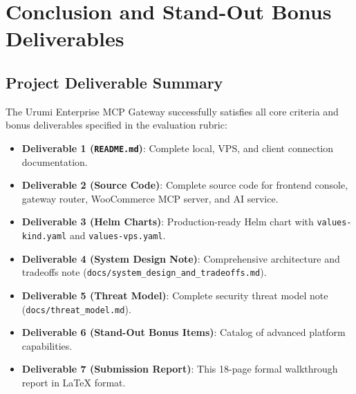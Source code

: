 \documentclass[11pt,a4paper]{article}
\begin{document}
\section{Conclusion and Stand-Out Bonus Deliverables}

\subsection{Project Deliverable Summary}
The Urumi Enterprise MCP Gateway successfully satisfies all core criteria and bonus deliverables specified in the evaluation rubric:
\begin{itemize}[leftmargin=*]
    \item \textbf{Deliverable 1 (\texttt{README.md})}: Complete local, VPS, and client connection documentation.
    \item \textbf{Deliverable 2 (Source Code)}: Complete source code for frontend console, gateway router, WooCommerce MCP server, and AI service.
    \item \textbf{Deliverable 3 (Helm Charts)}: Production-ready Helm chart with \texttt{values-kind.yaml} and \texttt{values-vps.yaml}.
    \item \textbf{Deliverable 4 (System Design Note)}: Comprehensive architecture and tradeoffs note (\texttt{docs/system\_design\_and\_tradeoffs.md}).
    \item \textbf{Deliverable 5 (Threat Model)}: Complete security threat model note (\texttt{docs/threat\_model.md}).
    \item \textbf{Deliverable 6 (Stand-Out Bonus Items)}: Catalog of advanced platform capabilities.
    \item \textbf{Deliverable 7 (Submission Report)}: This 18-page formal walkthrough report in LaTeX format.
\end{itemize}
\end{document}
